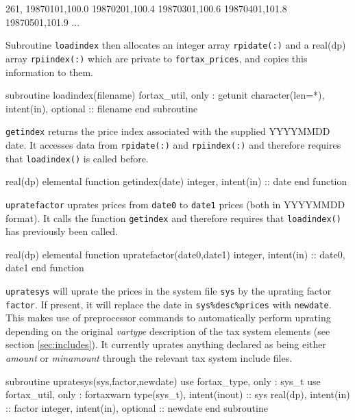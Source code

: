 \documentclass[11pt,thmsa,letter,ukenglish]{article}
\begin{document}
\begin{csvcode}[title={Extract from \texttt{prices/rpi.csv}},frame=lines]
261,
19870101,100.0
19870201,100.4
19870301,100.6
19870401,101.8
19870501,101.9
...
\end{csvcode}

\noindent Subroutine \texttt{loadindex} then allocates an integer array \texttt{rpidate(:)} and a real(dp) array \texttt{rpiindex(:)} which are private to \texttt{fortax\_prices}, and copies this information to them.

\begin{fortrancode}
subroutine loadindex(filename)
    fortax_util, only : getunit
    character(len=*), intent(in), optional :: filename
end subroutine
\end{fortrancode}

\noindent\texttt{getindex} returns the price index associated with the supplied YYYYMMDD date. It accesses data from \texttt{rpidate(:)} and \texttt{rpiindex(:)} and therefore requires that \texttt{loadindex()} is called before.

\begin{fortrancode}
real(dp) elemental function getindex(date)
    integer, intent(in) :: date
end function
\end{fortrancode}

\noindent\texttt{upratefactor} uprates prices from \texttt{date0} to \texttt{date1} prices (both in YYYYMMDD format). It calls the function \texttt{getindex} and therefore requires that \texttt{loadindex()} has previously been called.
\begin{fortrancode}
real(dp) elemental function upratefactor(date0,date1)
    integer, intent(in) :: date0, date1
end function
\end{fortrancode}

\noindent\texttt{upratesys} will uprate the prices in the system file \texttt{sys} by the uprating factor \texttt{factor}. If present, it will replace the date in \texttt{sys\%desc\%prices} with \texttt{newdate}. This makes use of preprocessor commands to automatically perform uprating depending on the original \emph{vartype} description of the tax system elements (see section \ref{sec:includes}). It currently uprates anything declared as being either \emph{amount} or \emph{minamount} through the relevant tax system include files.

\begin{fortrancode}
subroutine upratesys(sys,factor,newdate)
    use fortax_type, only : sys_t
    use fortax_util, only : fortaxwarn
    type(sys_t), intent(inout)        :: sys
    real(dp),    intent(in)           :: factor
    integer,     intent(in), optional :: newdate
end subroutine
\end{fortrancode}
\end{document}
